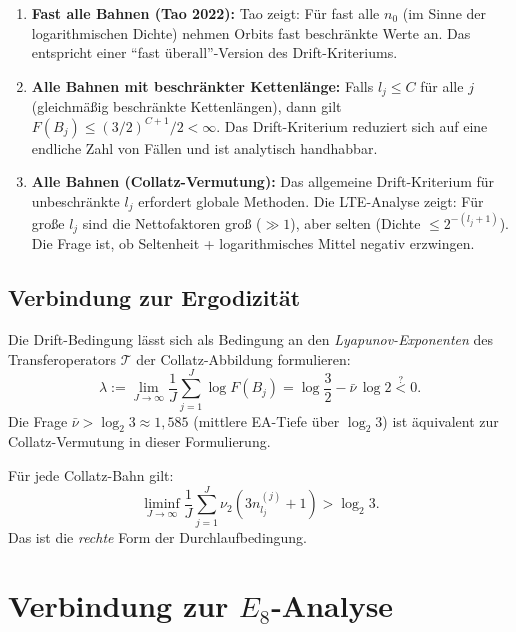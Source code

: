 \documentclass[12pt,a4paper]{article}
\newcommand{\vii}{\nu_2}
\begin{document}
\begin{enumerate}[label=\textbf{(\arabic*)}, leftmargin=*]
  \item \textbf{Fast alle Bahnen (Tao 2022):}
    Tao zeigt: Für fast alle $n_0$ (im Sinne der logarithmischen Dichte)
    nehmen Orbits fast beschränkte Werte an. Das entspricht einer
    ``fast überall''-Version des Drift-Kriteriums.

  \item \textbf{Alle Bahnen mit beschränkter Kettenlänge:}
    Falls $l_j \leq C$ für alle $j$ (gleichmäßig beschränkte Kettenlängen),
    dann gilt $F(B_j) \leq (3/2)^{C+1}/2 < \infty$. Das Drift-Kriterium
    reduziert sich auf eine endliche Zahl von Fällen und ist analytisch
    handhabbar.

  \item \textbf{Alle Bahnen (Collatz-Vermutung):}
    Das allgemeine Drift-Kriterium für unbeschränkte $l_j$ erfordert globale
    Methoden. Die LTE-Analyse zeigt: Für große $l_j$ sind die Nettofaktoren
    groß ($\gg 1$), aber selten (Dichte $\leq 2^{-(l_j+1)}$). Die Frage
    ist, ob Seltenheit + logarithmisches Mittel negativ erzwingen.
\end{enumerate}

\subsection{Verbindung zur Ergodizität}

Die Drift-Bedingung lässt sich als Bedingung an den \emph{Lyapunov-Exponenten}
des Transferoperators $\mathcal{T}$ der Collatz-Abbildung formulieren:
\[
  \lambda := \lim_{J\to\infty} \frac{1}{J}\sum_{j=1}^J \log F(B_j)
  = \log\frac{3}{2} - \bar\nu\,\log 2 \stackrel{?}{<} 0.
\]
Die Frage $\bar\nu > \log_2 3 \approx 1{,}585$ (mittlere EA-Tiefe über
$\log_2 3$) ist äquivalent zur Collatz-Vermutung in dieser Formulierung.

\begin{tcolorbox}[konj, title={Drift-Konjektur}]
Für jede Collatz-Bahn gilt:
\[
  \liminf_{J\to\infty} \frac{1}{J} \sum_{j=1}^J \vii(3n_{l_j}^{(j)}+1) > \log_2 3.
\]
Das ist die \emph{rechte} Form der Durchlaufbedingung.
\end{tcolorbox}

\section{Verbindung zur $E_8$-Analyse}
\label{sec:e8}
\end{document}
